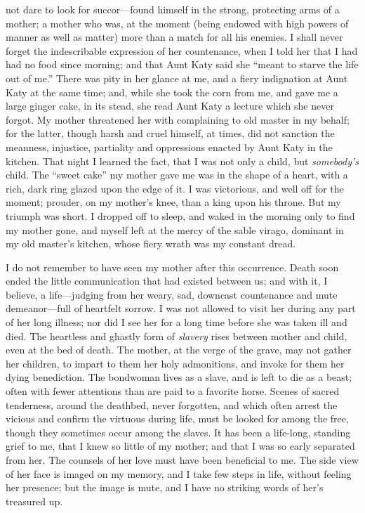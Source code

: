 not dare to look for succor---found himself in the strong, protecting
arms of a mother; a mother who was, at the moment (being endowed with
high powers of manner as well as matter) more than a match for all his
enemies. I shall never forget the indescribable expression of her
countenance, when I told her that I had had no food since morning; and
that Aunt Katy said she ``meant to starve the life out of me.'' There
was pity in her glance at me, and a fiery indignation at Aunt Katy at
the same time; and, while she took the corn from me, and gave me a large
ginger cake, in its stead, she read Aunt Katy a lecture which she never
forgot. My mother threatened her with complaining to old master in my
behalf; for the latter, though harsh and cruel himself, at times, did
not sanction the meanness, injustice, partiality and oppressions enacted
by Aunt Katy in the kitchen. That night I learned the fact, that I was
not only a child, but \emph{somebody's} child. The ``sweet cake'' my
mother gave me was in the shape of a heart, with a rich, dark ring
glazed upon the edge of it. I was victorious, and well off for the
moment; prouder, on my mother's knee, than a king upon his throne. But
my triumph was short. I dropped off to
{\protect\hypertarget{57}{}{}}sleep, and waked in the morning only to
find my mother gone, and myself left at the mercy of the sable virago,
dominant in my old master's kitchen, whose fiery wrath was my constant
dread.

I do not remember to have seen my mother after this occurrence. Death
soon ended the little communication that had existed between us; and
with it, I believe, a life---judging from her weary, sad, downcast
countenance and mute demeanor---full of heartfelt sorrow. I was not
allowed to visit her during any part of her long illness; nor did I see
her for a long time before she was taken ill and died. The heartless and
ghastly form of \emph{slavery} rises between mother and child, even at
the bed of death. The mother, at the verge of the grave, may not gather
her children, to impart to them her holy admonitions, and invoke for
them her dying benediction. The bondwoman lives as a slave, and is left
to die as a beast; often with fewer attentions than are paid to a
favorite horse. Scenes of sacred tenderness, around the deathbed, never
forgotten, and which often arrest the vicious and confirm the virtuous
during life, must be looked for among the free, though they sometimes
occur among the slaves. It has been a life-long, standing grief to me,
that I knew so little of my mother; and that I was so early separated
from her. The counsels of her love must have been beneficial to me. The
side view of her face is imaged on my memory, and I take few steps in
life, without feeling her presence; but the image is mute, and I have no
striking words of her's treasured up.

